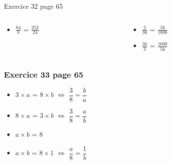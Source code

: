 \documentclass[xcolor={dvipsnames}, handout]{beamer}
\begin{document}
\begin{frame}
\begin{block}{Exercice 32 page 65}
\begin{columns}
\begin{column}{0.25\textwidth}
\begin{LARGE}
\begin{itemize}
						\item $\frac{84}{8}$ = $\frac{252}{24}$\pause			
					\end{itemize}	
				\end{LARGE}
				
			\end{column}
			
			\begin{column}{0.25\textwidth}
				\begin{LARGE}
					\begin{itemize}
						\item $\frac{2}{36}$ = $\frac{56}{1008}$					
						
						\item $\frac{36}{2}$ = $\frac{1008}{56}$
					\end{itemize}	
				\end{LARGE}
				
			\end{column}
		\end{columns}
	\end{block}
	
\end{frame}

\begin{frame}
	\frametitle{Exercice 33 page 65}
	
	\begin{LARGE}
		\begin{itemize}
			\setlength\itemsep{1em}
			\item $3 \times a$ = $8 \times b$ $\Leftrightarrow$ $\dfrac{3}{8} = \dfrac{b}{a}$    \pause
			
			\item $8 \times a$ = $3 \times b$ $\Leftrightarrow$ $\dfrac{3}{8} = \dfrac{a}{b}$     \pause
			
			\item<3> $a \times b$ = $8$  \pause
			
			\item<4> $a \times b$ = $8 \times 1$ $\Leftrightarrow$ $\dfrac{a}{8} = \dfrac{1}{b}$     \pause
		\end{itemize}
	\end{LARGE}
	
\end{frame}
\end{document}
